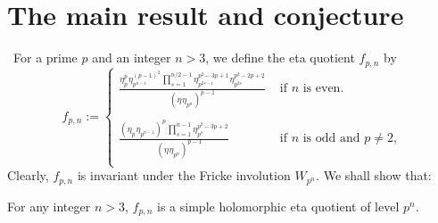 \documentclass[a4paper,11pt]{amsart}
\begin{document}
\section{The main result and conjecture}

\ \quad For a prime $p$ and an integer $n>3$, we define the eta quotient $f_{p,n}$ by 
 \begin{equation}%
f_{p,n}:=\left\{\begin{array}{cl}
{\frac{\displaystyle{\eta_p^p\hspace{1pt}\eta_{p^{n-1}}^{(p-1)^2}\hspace{1pt}\prod_{s=1}^{n/2-1}\eta_{p^{2s-1}}^{p^2-3p+1}\hspace{1pt}\eta_{p^{2s}}^{p^2-2p+2}}}{\displaystyle{(\eta\hspace{1pt}\eta_{p^n})^{p-1}}}}&\text{ if $n$ is even.}\\     
\\
{\frac{\displaystyle{(\eta_p\hspace{1pt}\eta_{p^{n-1}})^p\hspace{1pt}\prod_{s=1}^{n-1}\eta_{p^s}^{p^2 - 3p + 2}}}{\ \quad\displaystyle{(\eta\hspace{1pt}\eta_{p^n})^{p-1}}}}&\text{ if $n$ is odd and $p\neq2$,}\\ %
                 \end{array}\right.\label{fpn}\end{equation}
Clearly, %
$f_{p,n}$ is invariant under the Fricke involution $W_{p^n}$.
We shall show that: 
 \begin{theorem}
 For any integer $n>3$, %
 $f_{p,n}$ is a simple holomorphic eta quotient of level $p^n$.
\label{prp1}\end{theorem}
\end{document}
